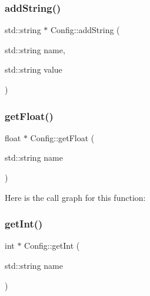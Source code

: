 \hypertarget{class_mason_1_1_config_a426f9e3f5de94a89dadfb7531d3b1d39}{}\label{class_mason_1_1_config_a426f9e3f5de94a89dadfb7531d3b1d39} 
\subsubsection{\texorpdfstring{add\+String()}{addString()}}
{\footnotesize\ttfamily std\+::string $\ast$ Config\+::add\+String (\begin{DoxyParamCaption}\item[{std\+::string}]{name,  }\item[{std\+::string}]{value }\end{DoxyParamCaption})\hspace{0.3cm}{\ttfamily [static]}}

\hypertarget{class_mason_1_1_config_a0e95110c092d4d3617a54a3ab3e4f70a}{}\label{class_mason_1_1_config_a0e95110c092d4d3617a54a3ab3e4f70a} 
\subsubsection{\texorpdfstring{get\+Float()}{getFloat()}}
{\footnotesize\ttfamily float $\ast$ Config\+::get\+Float (\begin{DoxyParamCaption}\item[{std\+::string}]{name }\end{DoxyParamCaption})\hspace{0.3cm}{\ttfamily [static]}}

Here is the call graph for this function\+:
\hypertarget{class_mason_1_1_config_aafb3b1eb520c81f3002d4aa78e400ea0}{}\label{class_mason_1_1_config_aafb3b1eb520c81f3002d4aa78e400ea0} 
\subsubsection{\texorpdfstring{get\+Int()}{getInt()}}
{\footnotesize\ttfamily int $\ast$ Config\+::get\+Int (\begin{DoxyParamCaption}\item[{std\+::string}]{name }\end{DoxyParamCaption})\hspace{0.3cm}{\ttfamily [static]}}

